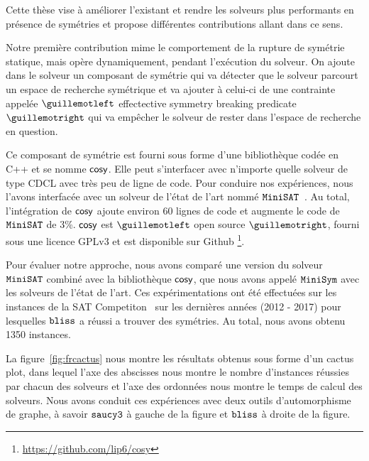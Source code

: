 Cette thèse vise à améliorer l'existant et rendre les solveurs plus performants en présence de symétries et
propose différentes contributions allant dans ce sens.  



Notre première contribution mime le comportement de la rupture de symétrie statique, mais 
opère dynamiquement, pendant l'exécution du solveur. On ajoute dans le solveur un composant de symétrie
qui va détecter que le solveur parcourt un espace de recherche symétrique et va ajouter à celui-ci de une contrainte appelée $\guillemotleft$ effectective symmetry breaking predicate $\guillemotright$ qui va empêcher le solveur de rester dans
l'espace de recherche en question. 




Ce composant de symétrie est fourni sous forme d'une bibliothèque codée en C++ et se nomme $\textsf{cosy}$.
Elle peut s'interfacer avec n'importe quelle solveur de type CDCL avec très peu de ligne de code. 
Pour conduire nos expériences, nous l'avons interfacée avec un solveur de l'état de l'art nommé $\texttt{MiniSAT}$~\cite{een2003extensible}. Au total, l'intégration de $\textsf{cosy}$ ajoute environ 60 lignes de code 
et augmente le code de $\texttt{MiniSAT}$ de 3\%.
$\textsf{cosy}$ est $\guillemotleft$ open source $\guillemotright$, fourni sous une licence GPLv3 et est disponible sur Github \footnote{\url{https://github.com/lip6/cosy}}.


Pour évaluer notre approche, nous avons comparé une version du solveur $\texttt{MiniSAT}$ combiné avec la bibliothèque $\textsf{cosy}$, que nous avons appelé $\texttt{MiniSym}$ avec les solveurs de l'état de l'art.
Ces expérimentations ont été effectuées sur les instances de la SAT Competiton~\cite{jarvisalo2012international} sur les dernières années (2012 - 2017) pour lesquelles $\texttt{bliss}$ a réussi a trouver des symétries. Au total, nous avons obtenu 1350 instances.

La figure~\ref{fig:frcactus} nous montre les résultats obtenus sous forme d'un cactus plot, 
dans lequel l'axe des abscisses nous montre le nombre d'instances réussies par chacun des solveurs et l'axe des ordonnées nous montre le temps de calcul des solveurs.
Nous avons conduit ces expériences avec deux outils d'automorphisme de graphe, à savoir 
$\texttt{saucy3}$ à gauche de la figure et $\texttt{bliss}$ à droite de la figure. 

